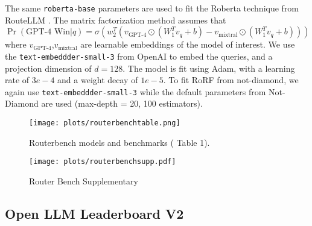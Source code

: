 The same \texttt{roberta-base} parameters are used to fit the Roberta technique from RouteLLM \citep{ong2024routellmlearningroutellms}.  The matrix factorization method assumes that 
\[\Pr(\text{GPT-4 Win}|q) = \sigma(w_2^T(v_{\text{GPT-4}}\odot(W_1^T v_q+b)- v_{\text{mixtral}}\odot(W_1^T v_q+b)) )\]
where $v_{\text{GPT-4}}$,$v_{\text{mixtral}}$ are learnable embeddings of the model of interest. We use the \texttt{text-embeddder-small-3} from OpenAI to embed the queries, and a projection dimension of $d=128$. The model is fit using Adam, with a learning rate of $3e-4$ and a weight decay of $1e-5$. To fit RoRF from not-diamond, we again use \texttt{text-embeddder-small-3} while the default parameters from Not-Diamond are used (max-depth = 20, 100 estimators).
\begin{figure}[H]
    \centering
        \texttt{[image: plots/routerbenchtable.png]} 
\caption{Routerbench models and benchmarks (\citep{hu2024routerbench} Table 1).}
\label{fig:routerbench-table}
\end{figure}

\begin{figure}[h]
    \centering
    \texttt{[image: plots/routerbenchsupp.pdf]}
    \caption{Router Bench Supplementary}
    \label{fig:rbenchsupp}
\end{figure}

\subsection{Open LLM Leaderboard V2}\label{append:llms_open}


